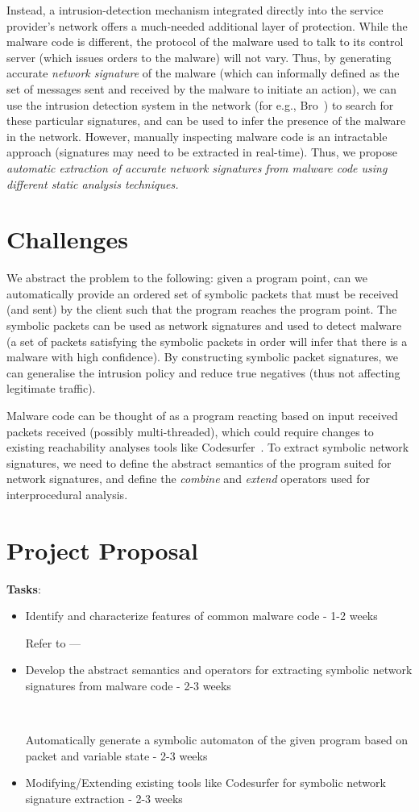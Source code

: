 \documentclass[]{article}
\newcommand{\deleted}[1]{%
	\cbcolor{red}
	\begin{changebar}
		#1
	\end{changebar}%
}%
\newcommand{\added}[1]{%
	\cbcolor{green}
	\begin{changebar}
		#1
	\end{changebar}%
}%
\begin{document}
Instead, a intrusion-detection mechanism integrated 
directly into the service provider’s network offers a
much-needed additional layer of protection. While the malware
code is different, the protocol of the malware used to talk to its
control server (which issues orders to the malware) will not vary. 
Thus, by generating accurate \emph{network signature} of the malware (which
can informally defined as the set of messages sent and received by the malware to
initiate an action), we can use the intrusion detection system in the
network (for e.g., Bro~\cite{bro}) to search for these particular signatures,
and can be used to infer the presence of the malware in the network. However,
manually inspecting malware code is an intractable approach (signatures may 
need to be extracted in real-time). Thus, we propose \emph{automatic extraction 
of accurate network signatures from malware code using different static
analysis techniques.} 

\section{Challenges}
We abstract the problem to the following: given a program point,
can we automatically provide an ordered set of symbolic packets 
that must be received (and sent) by the client such that the program 
reaches the program point. The symbolic packets can be used as
network signatures and used to detect malware (a set of packets
satisfying the symbolic packets in order will infer that there 
is a malware with high confidence). By constructing symbolic packet
signatures, we can generalise the intrusion policy and reduce 
true negatives (thus not affecting legitimate traffic).

Malware code can be thought of as a program reacting based on input received
packets received (possibly multi-threaded), which
could require changes to existing reachability analyses tools 
like Codesurfer~\cite{codesurfer}. To extract symbolic network
signatures, we need to define the abstract semantics of the program
suited for network signatures, and define the \emph{combine} and 
\emph{extend} operators used for interprocedural analysis.

\section{Project Proposal}
\textbf{Tasks}:
\begin{itemize}
	\item Identify and characterize features of common malware code - 1-2 weeks
	\added{Refer to ---}
	\item \deleted{Develop the abstract semantics and operators for extracting  
	symbolic network signatures from malware code - 2-3 weeks} \\
	\added{Automatically generate a symbolic automaton of the given program
		based on packet and variable state - 2-3 weeks}
	\item Modifying/Extending existing tools like Codesurfer for symbolic 
	network signature extraction - 2-3 weeks
\end{itemize}
\end{document}
